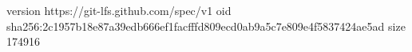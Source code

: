 version https://git-lfs.github.com/spec/v1
oid sha256:2c1957b18e87a39edb666ef1facfffd809ecd0ab9a5c7e809e4f5837424ae5ad
size 174916
